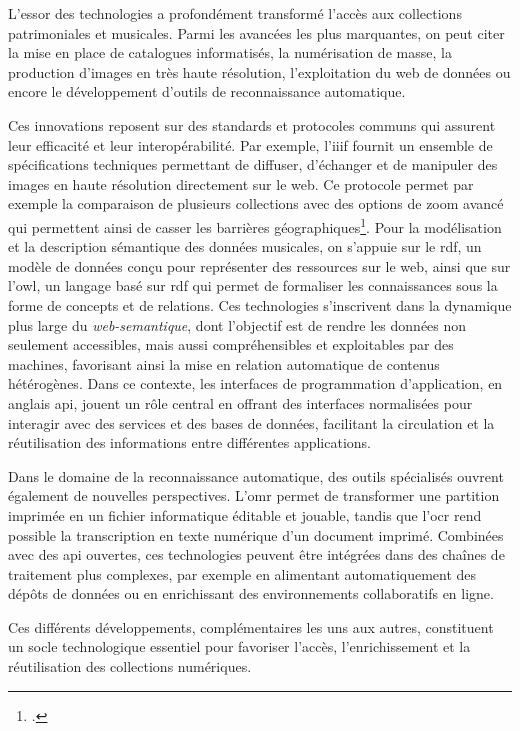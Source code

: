 L’essor des technologies a profondément transformé l’accès aux collections patrimoniales et musicales. Parmi les avancées les plus marquantes, on peut citer la mise en place de catalogues informatisés, la numérisation de masse, la production d’images en très haute résolution, l’exploitation du web de données ou encore le développement d’outils de reconnaissance automatique.

Ces innovations reposent sur des standards et protocoles communs qui assurent leur efficacité et leur interopérabilité. Par exemple, l’\gls{iiif} fournit un ensemble de spécifications techniques permettant de diffuser, d’échanger et de manipuler des images en haute résolution directement sur le web. Ce protocole permet par exemple la comparaison de plusieurs collections avec des options de zoom avancé qui permettent ainsi de casser les barrières géographiques\footcite{fresquetIIIFConnectivityMedieval}. Pour la modélisation et la description sémantique des données musicales, on s’appuie sur le \gls{rdf}, un modèle de données conçu pour représenter des ressources sur le web, ainsi que sur l’\gls{owl}, un langage basé sur \gls{rdf} qui permet de formaliser les connaissances sous la forme de concepts et de relations. Ces technologies s’inscrivent dans la dynamique plus large du \textit{\gls{web-semantique}}, dont l’objectif est de rendre les données non seulement accessibles, mais aussi compréhensibles et exploitables par des machines, favorisant ainsi la mise en relation automatique de contenus hétérogènes. Dans ce contexte, les interfaces de programmation d’application, en anglais \gls{api}, jouent un rôle central en offrant des interfaces normalisées pour interagir avec des services et des bases de données, facilitant la circulation et la réutilisation des informations entre différentes applications.

Dans le domaine de la reconnaissance automatique, des outils spécialisés ouvrent également de nouvelles perspectives. L’\gls{omr} permet de transformer une partition imprimée en un fichier informatique éditable et jouable, tandis que l’\gls{ocr} rend possible la transcription en texte numérique d’un document imprimé. Combinées avec des \gls{api} ouvertes, ces technologies peuvent être intégrées dans des chaînes de traitement plus complexes, par exemple en alimentant automatiquement des dépôts de données ou en enrichissant des environnements collaboratifs en ligne.

Ces différents développements, complémentaires les uns aux autres, constituent un socle technologique essentiel pour favoriser l’accès, l’enrichissement et la réutilisation des collections numériques.

